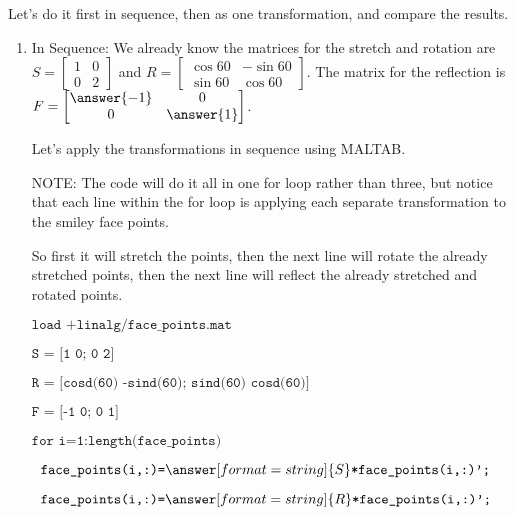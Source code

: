 \documentclass{ximera}
\begin{document}
\begin{exploration}
\begin{example}
        Let's do it first in sequence, then as one transformation, and compare the results.

        \begin{enumerate}

            \item In Sequence: We already know the matrices for the stretch and rotation are $S=\begin{bmatrix} 1 & 0 \\ 0 & 2 \end{bmatrix}$ and $R=\begin{bmatrix} \cos 60 & -\sin 60 \\ \sin 60 & \cos 60 \end{bmatrix}$. The matrix for the reflection is $F=\begin{bmatrix} \answer{-1} & 0 \\ 0 & \answer{1} \end{bmatrix}$.
            
            Let's apply the transformations in sequence using MALTAB. 
            
            \begin{hint}
            
            NOTE: The code will do it all in one for loop rather than three, but notice that each line within the for loop is applying each separate transformation to the smiley face points. 
            
            So first it will stretch the points, then the next line will rotate the already stretched points, then the next line will reflect the already stretched and rotated points.

            \end{hint}



            $\texttt{load +linalg/face\_points.mat}$

            $\texttt{S = [1 0; 0 2]}$

            $\texttt{R = [cosd(60) -sind(60); sind(60) cosd(60)]}$

            $\texttt{F = [-1 0; 0 1]}$

            $\texttt{for i=1:length(face\_points)}$

            $\texttt{    face\_points(i,:)=}\answer[format=string]{S}\texttt{*face\_points(i,:)';}$

            $\texttt{        face\_points(i,:)=}\answer[format=string]{R}\texttt{*face\_points(i,:)';}$


\end{enumerate}
\end{example}
\end{exploration}
\end{document}
